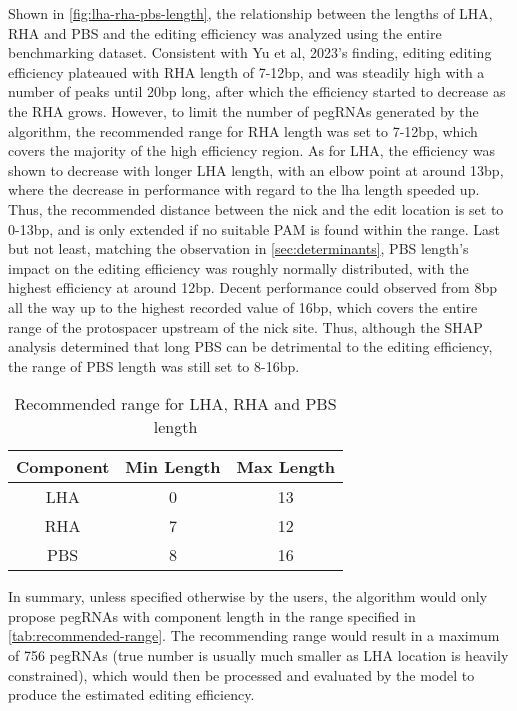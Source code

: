 Shown in \autoref{fig:lha-rha-pbs-length}, the relationship between the lengths of LHA, RHA and PBS and the editing efficiency was analyzed using the entire benchmarking dataset. Consistent with Yu et al, 2023's finding, editing editing efficiency plateaued with RHA length of 7-12bp, and was steadily high with a number of peaks until 20bp long, after which the efficiency started to decrease as the RHA grows. However, to limit the number of pegRNAs generated by the algorithm, the recommended range for RHA length was set to 7-12bp, which covers the majority of the high efficiency region.
 As for LHA, the efficiency was shown to decrease with longer LHA length, with an elbow point at around 13bp, where the decrease in performance with regard to the lha length speeded up. Thus, the recommended distance between the nick and the edit location is set to 0-13bp, and is only extended if no suitable PAM is found within the range. Last but not least, matching the observation in \autoref{sec:determinants}, PBS length's impact on the editing efficiency was roughly normally distributed, with the highest efficiency at around 12bp. Decent performance could observed from 8bp all the way up to the highest recorded value of 16bp, which covers the entire range of the protospacer upstream of the nick site. Thus, although the SHAP analysis determined that long PBS can be detrimental to the editing efficiency, the range of PBS length was still set to 8-16bp.

\begin{table}[ht]
    \centering
    \begin{tabular}{c|c|c}
        \textbf{Component} & \textbf{Min Length} & \textbf{Max Length} \\
        \hline
        LHA & 0 & 13 \\
        RHA & 7 & 12 \\
        PBS & 8 & 16 \\
    \end{tabular}
    \caption{Recommended range for LHA, RHA and PBS length}
    \label{tab:recommended-range}
\end{table}

In summary, unless specified otherwise by the users, the algorithm would only propose pegRNAs with component length in the range specified in \autoref{tab:recommended-range}. The recommending range would result in a maximum of 756 pegRNAs (true number is usually much smaller as LHA location is heavily constrained), which would then be processed and evaluated by the model to produce the estimated editing efficiency.

